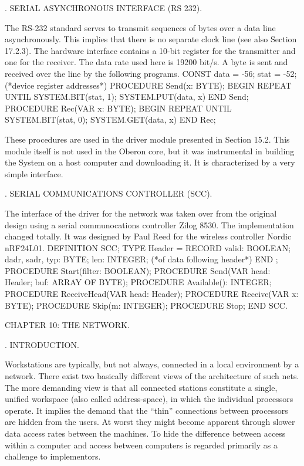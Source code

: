 . SERIAL ASYNCHRONOUS INTERFACE (RS 232).

The RS-232 standard serves to transmit sequences of bytes over a data line asynchronously. This implies that there is no separate clock line (see also Section 17.2.3). The hardware interface contains a 10-bit register for the transmitter and one for the receiver. The data rate used here is 19200 bit/s. A byte is sent and received over the line by the following programs.
\begintt
CONST data = -56; stat = -52; (*device register addresses*)
PROCEDURE Send(x: BYTE); BEGIN
REPEAT UNTIL SYSTEM.BIT(stat, 1);
SYSTEM.PUT(data, x) END Send;
PROCEDURE Rec(VAR x: BYTE); BEGIN
REPEAT UNTIL SYSTEM.BIT(stat, 0);
SYSTEM.GET(data, x) END Rec;
\endtt

\noindent These procedures are used in the driver module  presented in Section 15.2. This module itself is not used in the Oberon core, but it was instrumental in building the System on a host computer and downloading it. It is characterized by a very simple interface.

. SERIAL COMMUNICATIONS CONTROLLER (SCC).

The interface of the driver for the network was taken over from the original design using a serial communocations controller Zilog 8530. The implementation changed totally. It was designed by Paul Reed for the wireless controller Nordic nRF24L01.
\begintt
DEFINITION SCC;
TYPE Header =
RECORD valid: BOOLEAN; dadr, sadr, typ: BYTE;
len: INTEGER; (*of data following header*) END ;
PROCEDURE Start(filter: BOOLEAN);
PROCEDURE Send(VAR head: Header; buf: ARRAY OF BYTE); PROCEDURE Available(): INTEGER;
PROCEDURE ReceiveHead(VAR head: Header);
PROCEDURE Receive(VAR x: BYTE);
PROCEDURE Skip(m: INTEGER);
PROCEDURE Stop;
END SCC.
\endtt

\beginchapter CHAPTER 10: THE NETWORK.

. INTRODUCTION.

Workstations are typically, but not always, connected in a local environment by a network. There exist two basically different views of the architecture of such nets. The more demanding view is that all connected stations constitute a single, unified workspace (also called address-space), in which the individual processors operate. It implies the demand that the ``thin'' connections between processors are hidden from the users. At worst they might become apparent through slower data access rates between the machines. To hide the difference between access within a computer and access between computers is regarded primarily as a challenge to implementors.

